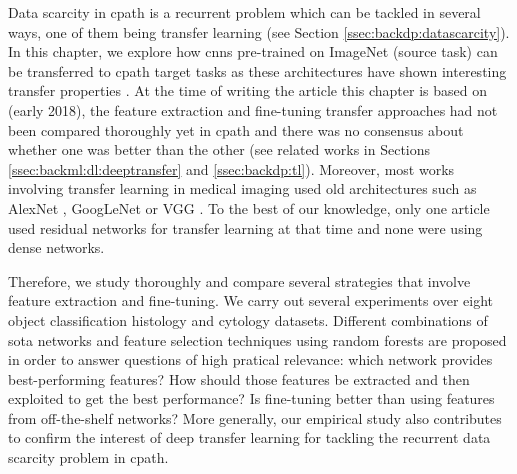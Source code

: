 
Data scarcity in \acrlong{cpath} is a recurrent problem which can be tackled in several ways, one of them being transfer learning (see Section \ref{ssec:backdp:datascarcity}). In this chapter, we explore how \acrlong{cnn}s pre-trained on ImageNet \cite{deng2009imagenet} (source task) can be transferred to \acrlong{cpath} target tasks as these architectures have shown interesting transfer properties \cite{donahue2014decaf,yosinski2014transferable,sermanet2013overfeat}. At the time of writing the article this chapter is based on (early 2018), the feature extraction and fine-tuning transfer approaches had not been compared thoroughly yet in \acrlong{cpath} and there was no consensus about whether one was better than the other (see related works in Sections \ref{ssec:backml:dl:deeptransfer} and \ref{ssec:backdp:tl}). Moreover, most works involving transfer learning in medical imaging used old architectures such as AlexNet \cite{shin2016deep,bayramoglu2016transfer,antony2016quantifying,ravishankar2016understanding,tajbakhsh2016convolutional,kumar2017comparative,kim2016deep}, GoogLeNet \cite{shin2016deep,bayramoglu2016transfer} or VGG \cite{kieffer2017convolutional,bayramoglu2016transfer,antony2016quantifying,yu2017deep,hou2016automatic,kumar2017comparative}. To the best of our knowledge, only one article used residual networks for transfer learning at that time \cite{yu2017deep} and none were using dense networks.

Therefore, we study thoroughly and compare several strategies that involve feature extraction and fine-tuning. We carry out several experiments over eight object classification histology and cytology datasets. Different combinations of \acrlong{sota} networks and feature selection techniques using random forests are proposed in order to answer questions of high pratical relevance: which network provides best-performing features? How should those features be extracted and then exploited to get the best performance? Is fine-tuning better than using features from off-the-shelf networks? More generally, our empirical study also contributes to confirm the interest of deep transfer learning for tackling the recurrent data scarcity problem in \acrlong{cpath}.

